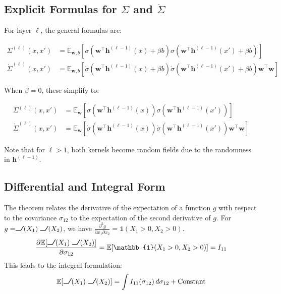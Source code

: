 \documentclass[a4paper]{article}
\DeclareRobustCommand{\ReLU}{\mathrel{\text{%
    \begin{tikzpicture}[baseline=(current bounding box.south)]
        \draw[thick] (0,0) -- (0.25,0) -- (0.4,0.25);
    \end{tikzpicture}}}\!\!}
\newcommand{\E}{\mathbb{E}}
\newcommand{\indic}{\mathbb{1}}
\newcommand{\dd}{\,d}
\begin{document}
\subsection{Explicit Formulas for $\Sigma$ and $\dot{\Sigma}$}

For layer $\ell$, the general formulas are:

\begin{align*}
\Sigma^{(\ell)}(x, x') &= \mathbb{E}_{\bm{w}, b} \left[ \sigma(\bm{w}^\top \bm{h}^{(\ell-1)}(x) + \beta b) \sigma(\bm{w}^\top \bm{h}^{(\ell-1)}(x') + \beta b) \right] \\
\dot{\Sigma}^{(\ell)}(x, x') &= \mathbb{E}_{\bm{w}, b} \left[ \dot{\sigma}(\bm{w}^\top \bm{h}^{(\ell-1)}(x) + \beta b) \dot{\sigma}(\bm{w}^\top \bm{h}^{(\ell-1)}(x') + \beta b) \bm{w}^\top\bm{w} \right]
\end{align*}

When $\beta = 0$, these simplify to:

\begin{align*}
\Sigma^{(\ell)}(x, x') &= \mathbb{E}_{\bm{w}} \left[ \sigma(\bm{w}^\top \bm{h}^{(\ell-1)}(x)) \sigma(\bm{w}^\top \bm{h}^{(\ell-1)}(x')) \right] \\
\dot{\Sigma}^{(\ell)}(x, x') &= \mathbb{E}_{\bm{w}} \left[ \dot{\sigma}(\bm{w}^\top \bm{h}^{(\ell-1)}(x)) \dot{\sigma}(\bm{w}^\top \bm{h}^{(\ell-1)}(x')) \bm{w}^\top\bm{w} \right]
\end{align*}

Note that for $\ell > 1$, both kernels become random fields due to the randomness in $\bm{h}^{(\ell-1)}$.




\subsection{Differential and Integral Form}
The theorem relates the derivative of the expectation of a function $g$ with respect to the covariance $\sigma_{12}$ to the expectation of the second derivative of $g$. For $g = \ReLU(X_1)\ReLU(X_2)$, we have $\frac{\partial^2 g}{\partial x_1 \partial x_2} = \indic(X_1>0, X_2>0)$.
\[
\frac{\partial \E[\ReLU(X_1)\ReLU(X_2)]}{\partial \sigma_{12}} = \E[\indic(X_1>0, X_2>0)] = I_{11}
\]
This leads to the integral formulation:
\[
\E[\ReLU(X_1)\ReLU(X_2)] = \int I_{11}(\sigma_{12}) \dd\sigma_{12} + \text{Constant}
\]
\end{document}
